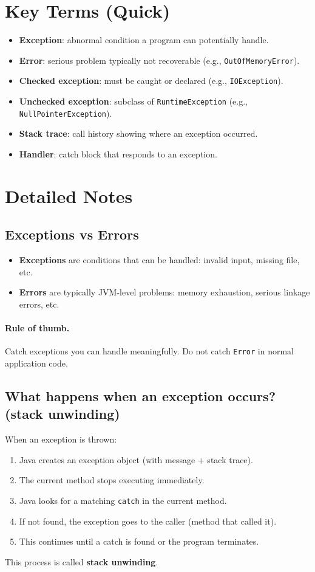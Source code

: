 \documentclass[11pt]{article}
\begin{document}
\section{Key Terms (Quick)}
\begin{itemize}
  \item \textbf{Exception}: abnormal condition a program can potentially handle.
  \item \textbf{Error}: serious problem typically not recoverable (e.g., \texttt{OutOfMemoryError}).
  \item \textbf{Checked exception}: must be caught or declared (e.g., \texttt{IOException}).
  \item \textbf{Unchecked exception}: subclass of \texttt{RuntimeException} (e.g., \texttt{NullPointerException}).
  \item \textbf{Stack trace}: call history showing where an exception occurred.
  \item \textbf{Handler}: catch block that responds to an exception.
\end{itemize}

\section{Detailed Notes}
\subsection{Exceptions vs Errors}
\begin{itemize}
  \item \textbf{Exceptions} are conditions that can be handled: invalid input, missing file, etc.
  \item \textbf{Errors} are typically JVM-level problems: memory exhaustion, serious linkage errors, etc.
\end{itemize}

\paragraph{Rule of thumb.} Catch exceptions you can handle meaningfully. Do not catch \texttt{Error} in normal application code.

\subsection{What happens when an exception occurs? (stack unwinding)}
When an exception is thrown:
\begin{enumerate}
  \item Java creates an exception object (with message + stack trace).
  \item The current method stops executing immediately.
  \item Java looks for a matching \texttt{catch} in the current method.
  \item If not found, the exception goes to the caller (method that called it).
  \item This continues until a catch is found or the program terminates.
\end{enumerate}
This process is called \textbf{stack unwinding}.
\end{document}
